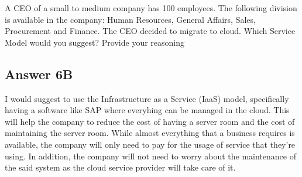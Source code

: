 \documentclass[
  11pt, %
]{assignment}
\begin{document}
\begin{problem}
A CEO of a small to medium company has 100 employees. The following division is available in the company: Human Resources, General Affairs, Sales, Procurement and Finance. The CEO decided to migrate to cloud. Which Service Model would you suggest? Provide your reasoning
\end{problem}

\subsection*{Answer 6B}

I would suggest to use the Infrastructure as a Service (IaaS) model, specifically having a software like SAP where everyhing can be managed in the cloud. This will help the company to reduce the cost of having a server room and the cost of maintaining the server room. While almost everything that a business requires is available, the company will only need to pay for the usage of service that they're using. In addition, the company will not need to worry about the maintenance of the said system as the cloud service provider will take care of it.
\end{document}
